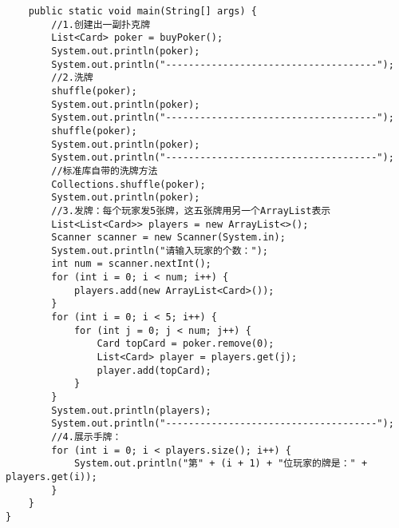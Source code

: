 \documentclass[a4paper]{report}
\begin{document}
\begin{lstlisting}
    public static void main(String[] args) {
        //1.创建出一副扑克牌
        List<Card> poker = buyPoker();
        System.out.println(poker);
        System.out.println("-------------------------------------");
        //2.洗牌
        shuffle(poker);
        System.out.println(poker);
        System.out.println("-------------------------------------");
        shuffle(poker);
        System.out.println(poker);
        System.out.println("-------------------------------------");
        //标准库自带的洗牌方法
        Collections.shuffle(poker);
        System.out.println(poker);
        //3.发牌：每个玩家发5张牌，这五张牌用另一个ArrayList表示
        List<List<Card>> players = new ArrayList<>();
        Scanner scanner = new Scanner(System.in);
        System.out.println("请输入玩家的个数：");
        int num = scanner.nextInt();
        for (int i = 0; i < num; i++) {
            players.add(new ArrayList<Card>());
        }
        for (int i = 0; i < 5; i++) {
            for (int j = 0; j < num; j++) {
                Card topCard = poker.remove(0);
                List<Card> player = players.get(j);
                player.add(topCard);
            }
        }
        System.out.println(players);
        System.out.println("-------------------------------------");
        //4.展示手牌：
        for (int i = 0; i < players.size(); i++) {
            System.out.println("第" + (i + 1) + "位玩家的牌是：" + players.get(i));
        }
    }
}
\end{lstlisting}
\end{document}
